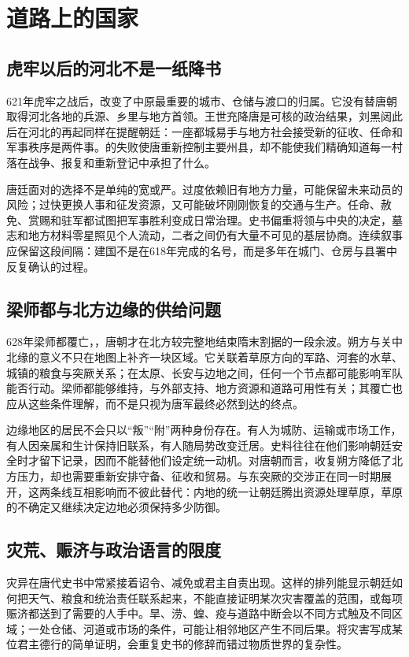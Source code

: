 \section{道路上的国家}
\label{sec:early-tang-acceptance-scenes-four}

\subsection{虎牢以后的河北不是一纸降书}
621年虎牢之战后，改变了中原最重要的城市、仓储与渡口的归属。它没有替唐朝取得河北各地的兵源、乡里与地方首领。王世充降唐是可核的政治结果，刘黑闼此后在河北的再起同样在提醒朝廷：一座都城易手与地方社会接受新的征收、任命和军事秩序是两件事。的失败使唐重新控制主要州县，却不能使我们精确知道每一村落在战争、报复和重新登记中承担了什么。

唐廷面对的选择不是单纯的宽或严。过度依赖旧有地方力量，可能保留未来动员的风险；过快更换人事和征发资源，又可能破坏刚刚恢复的交通与生产。任命、赦免、赏赐和驻军都试图把军事胜利变成日常治理。史书偏重将领与中央的决定，墓志和地方材料零星照见个人流动，二者之间仍有大量不可见的基层协商。连续叙事应保留这段间隔：建国不是在618年完成的名号，而是多年在城门、仓房与县署中反复确认的过程。

\subsection{梁师都与北方边缘的供给问题}
628年梁师都覆亡，，唐朝才在北方较完整地结束隋末割据的一段余波。朔方与关中北缘的意义不只在地图上补齐一块区域。它关联着草原方向的军路、河套的水草、城镇的粮食与突厥关系；在太原、长安与边地之间，任何一个节点都可能影响军队能否行动。梁师都能够维持，与外部支持、地方资源和道路可用性有关；其覆亡也应从这些条件理解，而不是只视为唐军最终必然到达的终点。

边缘地区的居民不会只以“叛”“附”两种身份存在。有人为城防、运输或市场工作，有人因亲属和生计保持旧联系，有人随局势改变迁居。史料往往在他们影响朝廷安全时才留下记录，因而不能替他们设定统一动机。对唐朝而言，收复朔方降低了北方压力，却也需要重新安排守备、征收和贸易。与东突厥的交涉正在同一时期展开，这两条线互相影响而不彼此替代：内地的统一让朝廷腾出资源处理草原，草原的不确定又继续决定边地必须保持多少防御。

\subsection{灾荒、赈济与政治语言的限度}
灾异在唐代史书中常紧接着诏令、减免或君主自责出现。这样的排列能显示朝廷如何把天气、粮食和统治责任联系起来，不能直接证明某次灾害覆盖的范围，或每项赈济都送到了需要的人手中。旱、涝、蝗、疫与道路中断会以不同方式触及不同区域；一处仓储、河道或市场的条件，可能让相邻地区产生不同后果。将灾害写成某位君主德行的简单证明，会重复史书的修辞而错过物质世界的复杂性。

